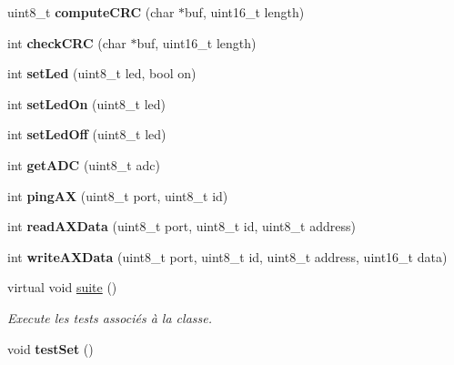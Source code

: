 \begin{DoxyCompactItemize}
uint8\+\_\+t {\bfseries compute\+C\+RC} (char $\ast$buf, uint16\+\_\+t length)
\item 
\mbox{\label{classtest_1_1CCAx12TeensyDriverTest_acede7a7f48ca19ea9b27752e27d5f8e6}} 
int {\bfseries check\+C\+RC} (char $\ast$buf, uint16\+\_\+t length)
\item 
\mbox{\label{classtest_1_1CCAx12TeensyDriverTest_a6181f83871ccfc99b58fa6b4a3a8c393}} 
int {\bfseries set\+Led} (uint8\+\_\+t led, bool on)
\item 
\mbox{\label{classtest_1_1CCAx12TeensyDriverTest_a1300e09367934e135d24791ba658280a}} 
int {\bfseries set\+Led\+On} (uint8\+\_\+t led)
\item 
\mbox{\label{classtest_1_1CCAx12TeensyDriverTest_a8ee6d0e6f98bedc6698966e987000702}} 
int {\bfseries set\+Led\+Off} (uint8\+\_\+t led)
\item 
\mbox{\label{classtest_1_1CCAx12TeensyDriverTest_a10ffe357112449a8ce2b77c923ad2f76}} 
int {\bfseries get\+A\+DC} (uint8\+\_\+t adc)
\item 
\mbox{\label{classtest_1_1CCAx12TeensyDriverTest_a40a07093133be1248bfaccc4562da56f}} 
int {\bfseries ping\+AX} (uint8\+\_\+t port, uint8\+\_\+t id)
\item 
\mbox{\label{classtest_1_1CCAx12TeensyDriverTest_a7823ddd3ee30ba20b4fc9fb65dd2c364}} 
int {\bfseries read\+A\+X\+Data} (uint8\+\_\+t port, uint8\+\_\+t id, uint8\+\_\+t address)
\item 
\mbox{\label{classtest_1_1CCAx12TeensyDriverTest_ac40db4c10bdb4bb0ea9907aab7459fb9}} 
int {\bfseries write\+A\+X\+Data} (uint8\+\_\+t port, uint8\+\_\+t id, uint8\+\_\+t address, uint16\+\_\+t data)
\item 
\mbox{\label{classtest_1_1CCAx12TeensyDriverTest_a0c204c4ca03833f6c4f19d79d69e49a5}} 
virtual void \hyperlink{classtest_1_1CCAx12TeensyDriverTest_a0c204c4ca03833f6c4f19d79d69e49a5}{suite} ()
\begin{DoxyCompactList}\small\item\em Execute les tests associés à la classe. \end{DoxyCompactList}\item 
\mbox{\label{classtest_1_1CCAx12TeensyDriverTest_a55ac957dc6dfbf6fcdc0a7aa5f984483}} 
void {\bfseries test\+Set} ()
\end{DoxyCompactItemize}
